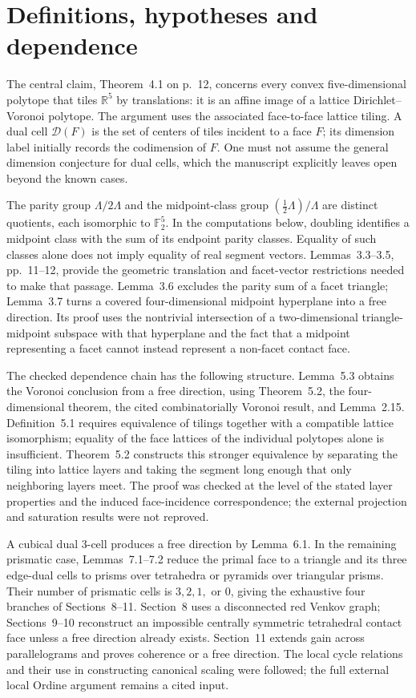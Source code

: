 \documentclass[10pt]{article}
\begin{document}
\section*{Definitions, hypotheses and dependence}
The central claim, Theorem 4.1 on p. 12, concerns every convex five-dimensional polytope that tiles \(\mathbb R^5\) by translations: it is an affine image of a lattice Dirichlet–Voronoi polytope. The argument uses the associated face-to-face lattice tiling. A dual cell \(\mathcal D(F)\) is the set of centers of tiles incident to a face \(F\); its dimension label initially records the codimension of \(F\). One must not assume the general dimension conjecture for dual cells, which the manuscript explicitly leaves open beyond the known cases.\par
The parity group \(\Lambda/2\Lambda\) and the midpoint-class group \((\tfrac12\Lambda)/\Lambda\) are distinct quotients, each isomorphic to \(\mathbb F_2^5\). In the computations below, doubling identifies a midpoint class with the sum of its endpoint parity classes. Equality of such classes alone does not imply equality of real segment vectors. Lemmas 3.3–3.5, pp. 11–12, provide the geometric translation and facet-vector restrictions needed to make that passage. Lemma 3.6 excludes the parity sum of a facet triangle; Lemma 3.7 turns a covered four-dimensional midpoint hyperplane into a free direction. Its proof uses the nontrivial intersection of a two-dimensional triangle-midpoint subspace with that hyperplane and the fact that a midpoint representing a facet cannot instead represent a non-facet contact face.\par
The checked dependence chain has the following structure. Lemma 5.3 obtains the Voronoi conclusion from a free direction, using Theorem 5.2, the four-dimensional theorem, the cited combinatorially Voronoi result, and Lemma 2.15. Definition 5.1 requires equivalence of tilings together with a compatible lattice isomorphism; equality of the face lattices of the individual polytopes alone is insufficient. Theorem 5.2 constructs this stronger equivalence by separating the tiling into lattice layers and taking the segment long enough that only neighboring layers meet. The proof was checked at the level of the stated layer properties and the induced face-incidence correspondence; the external projection and saturation results were not reproved.\par
A cubical dual 3-cell produces a free direction by Lemma 6.1. In the remaining prismatic case, Lemmas 7.1–7.2 reduce the primal face to a triangle and its three edge-dual cells to prisms over tetrahedra or pyramids over triangular prisms. Their number of prismatic cells is \(3,2,1,\) or \(0\), giving the exhaustive four branches of Sections 8–11. Section 8 uses a disconnected red Venkov graph; Sections 9–10 reconstruct an impossible centrally symmetric tetrahedral contact face unless a free direction already exists. Section 11 extends gain across parallelograms and proves coherence or a free direction. The local cycle relations and their use in constructing canonical scaling were followed; the full external local Ordine argument remains a cited input.\par
\end{document}
